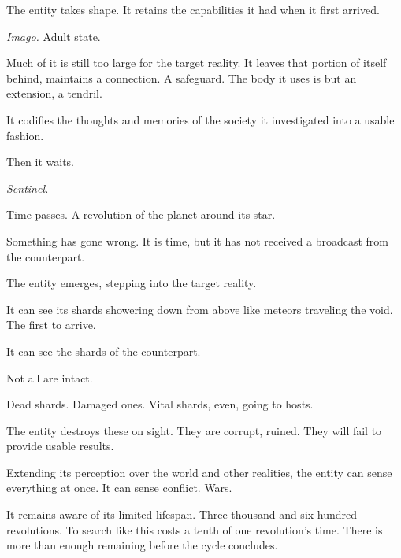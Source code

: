 The entity takes shape.  It retains the capabilities it had when it first arrived.



\emph{Imago.  }Adult state.



Much of it is still too large for the target reality.  It leaves that portion of itself behind, maintains a connection.  A safeguard.  The body it uses is but an extension, a tendril.



It codifies the thoughts and memories of the society it investigated into a usable fashion.



Then it waits.



\emph{Sentinel.}



Time passes.  A revolution of the planet around its star.



Something has gone wrong.  It is time, but it has not received a broadcast from the counterpart.



The entity emerges, stepping into the target reality.



It can see its shards showering down from above like meteors traveling the void.   The first to arrive.



It can see the shards of the counterpart.



Not all are intact.



Dead shards.  Damaged ones.  Vital shards, even, going to hosts.



The entity destroys these on sight.  They are corrupt, ruined.  They will fail to provide usable results.



Extending its perception over the world and other realities, the entity can sense everything at once.  It can sense conflict.  Wars.



It remains aware of its limited lifespan.  Three thousand and six hundred revolutions.  To search like this costs a tenth of one revolution's time.  There is more than enough remaining before the cycle concludes.




